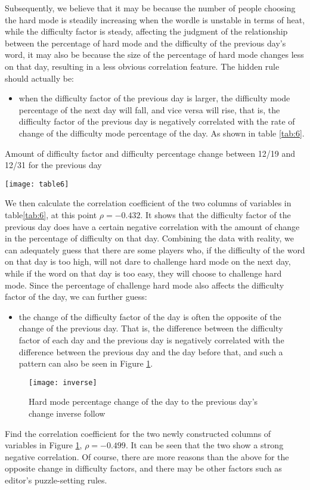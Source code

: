 \documentclass[12pt]{mcmthesis}
\begin{document}
Subsequently, we believe that it may be because the number of people choosing the hard mode is steadily increasing when the wordle is unstable in terms of heat, while the difficulty factor is steady, affecting the judgment of the relationship between the percentage of hard mode and the difficulty of the previous day's word, it may also be because the size of the percentage of hard mode changes less on that day, resulting in a less obvious correlation feature. The hidden rule should actually be: 
\begin{itemize}
	\item when the difficulty factor of the previous day is larger, the difficulty mode percentage of the next day will fall, and vice versa will rise, that is, the difficulty factor of the previous day is negatively correlated with the rate of change of the difficulty mode percentage of the day. As shown in table \ref{tab:6}.
\end{itemize}
\begin{table}[!htbp]
	\small
	\centering
	\caption{Amount of difficulty factor and difficulty percentage change between 12/19 and 12/31 for the previous day}
	\texttt{[image: table6]}
	\label{tab:6}
\end{table}
We then calculate the correlation coefficient of the two columns of variables in table\ref{tab:6}, at this point $ \rho=-0.432 $. It shows that the difficulty factor of the previous day does have a certain negative correlation with the amount of change in the percentage of difficulty on that day. Combining the data with reality, we can adequately guess that there are some players who, if the difficulty of the word on that day is too high, will not dare to challenge hard mode on the next day, while if the word on that day is too easy, they will choose to challenge hard mode. Since the percentage of challenge hard mode also affects the difficulty factor of the day, we can further guess: 
\begin{itemize}
	\item the change of the difficulty factor of the day is often the opposite of the change of the previous day. That is, the difference between the difficulty factor of each day and the previous day is negatively correlated with the difference between the previous day and the day before that, and such a pattern can also be seen in Figure \ref{fig:11}.
\end{itemize}
\begin{figure}[h]
	\small
	\centering
	\texttt{[image: inverse]}
	\caption{Hard mode percentage change of the day to the previous day's change inverse follow} 
	\label{fig:11}
\end{figure}
Find the correlation coefficient for the two newly constructed columns of variables in Figure \ref{fig:11}, $ \rho=-0.499 $. It can be seen that the two show a strong negative correlation. Of course, there are more reasons than the above for the opposite change in difficulty factors, and there may be other factors such as editor's puzzle-setting rules.
\\[0.01pt]
\end{document}
